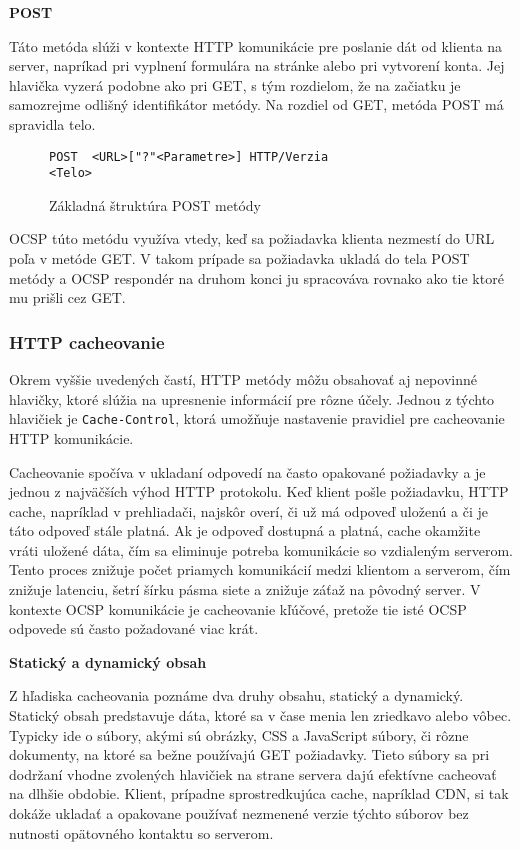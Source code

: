 \documentclass[12pt, twoside]{book}
\newcommand{\subsubsubsection}[1]{%
  \vspace{0.2em}  
  \textbf{#1} \\[0.2em]
  \hspace*{\parindent}
}
\begin{document}
\subsubsubsection{POST}
Táto metóda slúži v kontexte HTTP komunikácie pre poslanie dát od klienta na server, napríkad pri vyplnení formulára na stránke alebo pri vytvorení konta. Jej hlavička vyzerá podobne ako pri GET, s tým rozdielom, že na začiatku je samozrejme odlišný identifikátor metódy. Na rozdiel od GET, metóda POST má spravidla telo.

\begin{figure}[H]
\begin{lstlisting}
POST  <URL>["?"<Parametre>] HTTP/Verzia
<Telo>
\end{lstlisting}
\caption{Základná štruktúra POST metódy}
\end{figure}

OCSP túto metódu využíva vtedy, keď sa požiadavka klienta nezmestí do URL poľa v metóde GET. V takom prípade sa požiadavka ukladá do tela POST metódy a OCSP  respondér na druhom konci ju spracováva rovnako ako tie ktoré mu prišli cez GET.

\subsubsection{HTTP cacheovanie}
Okrem vyššie uvedených častí, HTTP metódy môžu obsahovať aj nepovinné hlavičky, ktoré slúžia na upresnenie informácií pre rôzne účely. Jednou z týchto hlavičiek je \texttt{Cache-Control}, ktorá umožňuje nastavenie pravidiel pre cacheovanie HTTP komunikácie.

Cacheovanie spočíva v ukladaní odpovedí na často opakované požiadavky a je jednou z najväčších výhod HTTP protokolu. Keď klient pošle požiadavku, HTTP cache, napríklad v prehliadači, najskôr overí, či už má odpoveď uloženú a či je táto odpoveď stále platná. Ak je odpoveď dostupná a platná, cache okamžite vráti uložené dáta, čím sa eliminuje potreba komunikácie so vzdialeným serverom.
Tento proces znižuje počet priamych komunikácií medzi klientom a serverom, čím znižuje latenciu, šetrí šírku pásma siete a znižuje záťaž na pôvodný server. V kontexte OCSP komunikácie je cacheovanie kľúčové, pretože tie isté OCSP odpovede sú často požadované viac krát.

\subsubsubsection{Statický a dynamický obsah}
Z hľadiska cacheovania poznáme dva druhy obsahu, statický a dynamický. Statický obsah predstavuje dáta, ktoré sa v čase menia len zriedkavo alebo vôbec. Typicky ide o súbory, akými sú obrázky, CSS a JavaScript súbory, či rôzne dokumenty, na ktoré sa bežne používajú GET požiadavky. Tieto súbory sa pri dodržaní vhodne zvolených hlavičiek na strane servera dajú efektívne cacheovať na dlhšie obdobie. Klient, prípadne sprostredkujúca cache, napríklad CDN, si tak dokáže ukladať a opakovane používať nezmenené verzie týchto súborov bez nutnosti opätovného kontaktu so serverom.
\end{document}
